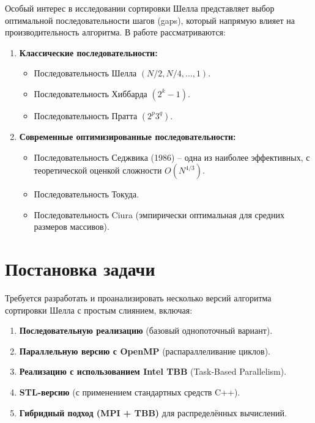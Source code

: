 \documentclass[a4paper,14pt]{extarticle}
\begin{document}
Особый интерес в исследовании сортировки Шелла представляет выбор оптимальной последовательности шагов (gaps), который напрямую влияет на производительность алгоритма. В работе рассматриваются:

\begin{enumerate}[leftmargin=*,itemsep=0pt]
    \item \textbf{Классические последовательности:}
    \begin{itemize}[leftmargin=*,nosep]
        \item Последовательность Шелла $(N/2, N/4, \dots, 1)$.
        \item Последовательность Хиббарда $(2^k - 1)$.
        \item Последовательность Пратта $(2^p3^q)$.
    \end{itemize}
    
    \item \textbf{Современные оптимизированные последовательности:}
    \begin{itemize}[leftmargin=*,nosep]
        \item Последовательность Седжвика (1986) -- одна из наиболее эффективных, с теоретической оценкой сложности $O(N^{4/3})$.
        \item Последовательность Токуда.
        \item Последовательность Ciura (эмпирически оптимальная для средних размеров массивов).
    \end{itemize}
\end{enumerate}

\newpage

\section*{Постановка задачи}
Требуется разработать и проанализировать несколько версий алгоритма сортировки Шелла с простым слиянием, включая:

\begin{enumerate}
    \item \textbf{Последовательную реализацию} (базовый однопоточный вариант).
    \item \textbf{Параллельную версию с OpenMP} (распараллеливание циклов).
    \item \textbf{Реализацию с использованием Intel TBB} (Task-Based Parallelism).
    \item \textbf{STL-версию} (с применением стандартных средств C++).
    \item \textbf{Гибридный подход (MPI + TBB)} для распределённых вычислений.
\end{enumerate}
\end{document}
